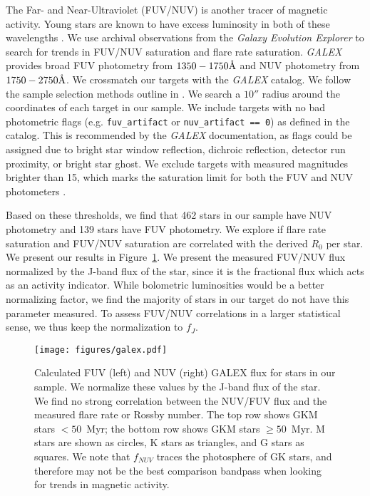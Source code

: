 \documentclass[twocolumn]{aastex631}
\newcommand{\angstrom}{\mbox{\normalfont\AA}}
\begin{document}
The Far- and Near-Ultraviolet (FUV/NUV) is another tracer of magnetic activity. Young
stars are known to have excess luminosity in both of these wavelengths \citep{}. We use
archival observations from the \textit{Galaxy Evolution Explorer}
\citep[\textit{GALEX};][]{martin05} to search for trends in FUV/NUV saturation and flare
rate saturation. \textit{GALEX} provides broad FUV photometry from $1350-1750 \angstrom$
and NUV photometry from $1750-2750 \angstrom$. We crossmatch our targets with the \textit{GALEX}
catalog. We follow the sample selection methods outline in \citep{schneider18}. We search
a $10''$ radius around the coordinates of each target in our sample. We include targets with
no bad photometric flags (e.g. \texttt{fuv\_artifact} or \texttt{nuv\_artifact == 0}) as defined
in the catalog. This is recommended by the \textit{GALEX} documentation, as flags could be
assigned due to bright star window reflection, dichroic reflection, detector run proximity,
or bright star ghost. We exclude targets with measured magnitudes brighter than 15, which
marks the saturation limit for both the FUV and NUV photometers \citep{morrissey07}.

Based on these thresholds, we find that 462 stars in our sample have NUV photometry and
139 stars have FUV photometry. We explore if flare rate saturation and FUV/NUV saturation
are correlated with the derived $R_0$ per star. We present our results in Figure~\ref{fig:galex}.
We present the measured FUV/NUV flux normalized by the J-band flux of the star, since it
is the fractional flux which acts as an activity indicator. While bolometric luminosities would
be a better normalizing factor, we find the majority of stars in our target do not have
this parameter measured. To assess FUV/NUV correlations in a larger statistical sense, we thus
keep the normalization to $f_J$.

\begin{figure}[ht!]
    \begin{centering}
        \texttt{[image: figures/galex.pdf]}
        \caption{
            Calculated FUV (left) and NUV (right) GALEX flux for stars in our
            sample. We normalize these values by the J-band flux of the star.
            We find no strong correlation between the NUV/FUV flux and the measured
            flare rate or Rossby number.
            The top row shows GKM stars $<50$~Myr; the bottom row
            shows GKM stars $\geq 50$~Myr. M stars are shown as circles, K stars as
            triangles, and G stars as squares. We note that $f_{NUV}$ traces the
            photosphere of GK stars, and therefore may not be the best comparison
            bandpass when looking for trends in magnetic activity.
        }
        \label{fig:galex}
    \end{centering}
\end{figure}
\end{document}
